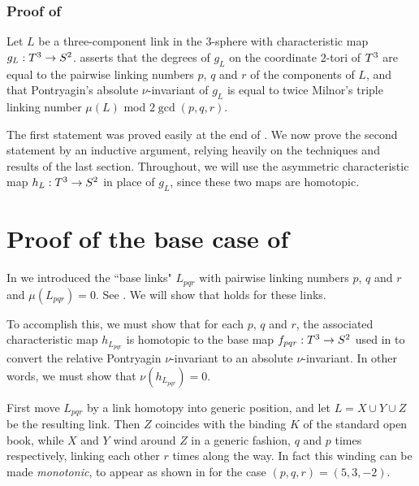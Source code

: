 

\section{Proof of }\label{sec:A}


Let $L$ be a three-component link in the $3$-sphere with characteristic map $g_L:T^3\to S^2$.   asserts that the degrees of $g_L$ on the coordinate $2$-tori of $T^3$ are equal to the pairwise linking numbers $p$, $q$ and $r$ of the components of $L$, and that Pontryagin's absolute $\nu$-invariant of $g_L$ is equal to twice Milnor's triple linking number $\mu(L)$ mod $2\gcd(p,q,r)$.  

The first statement was proved easily at the end of .  We now prove the second statement by an inductive argument, relying heavily on the techniques and results of the last section.  Throughout, we will use the asymmetric characteristic map $h_L:T^3\to S^2$ in place of $g_L$, since these two maps are homotopic.


\part{Proof of the base case of }


In  we introduced the  ``base links" $L_{pqr}$ with pairwise linking numbers $p$, $q$ and $r$ and $\mu(L_{pqr}) = 0$.  See .  We will show that  holds for these links.

To accomplish this, we must show that for each $p$, $q$ and $r$, the associated characteristic map $h_{L_{pqr}}$ is homotopic to the base map $f_{pqr}:T^3\to S^2$ used in  to convert the relative Pontryagin $\nu$-invariant to an absolute $\nu$-invariant.  In other words, we must show that $\nu(h_{L_{pqr}}) = 0$.

First move $L_{pqr}$ by a link homotopy into generic position, and let $L=X\cup Y\cup Z$ be the resulting link.  Then $Z$ coincides with the binding $K$ of the standard open book, while $X$ and $Y$ wind around $Z$ in a generic fashion, $q$ and $p$ times respectively, linking each other $r$ times along the way.  In fact this winding can be made {\it monotonic}, to appear as shown in  for the case $(p,q,r)=(5,3,-2)$. 

